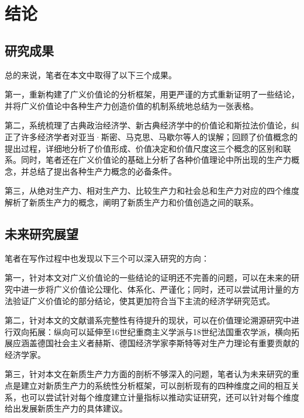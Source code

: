 
\chapter{结论}

\section{研究成果}

总的来说，笔者在本文中取得了以下三个成果。

第一，重新构建了广义价值论的分析框架，用更严谨的方式重新证明了一些结论，并将广义价值论中各种生产力创造价值的机制系统地总结为一张表格。

第二，系统梳理了古典政治经济学、新古典经济学中的价值论和斯拉法价值论，纠正了许多经济学者对亚当·斯密、马克思、马歇尔等人的误解；回顾了价值概念的提出过程，详细地分析了价值形成、价值决定和价值尺度这三个概念的区别和联系。同时，笔者还在广义价值论的基础上分析了各种价值理论中所出现的生产力概念，并总结了提出各种生产力概念的必备条件。

第三，从绝对生产力、相对生产力、比较生产力和社会总和生产力对应的四个维度解析了新质生产力的概念，阐明了新质生产力和价值创造之间的联系。

\section{未来研究展望}

笔者在写作过程中也发现以下三个可以深入研究的方向：

第一，针对本文对广义价值论的一些结论的证明还不完善的问题，可以在未来的研究中进一步将广义价值论公理化、体系化、严谨化；同时，还可以尝试用计量的方法验证广义价值论的部分结论，使其更加符合当下主流的经济学研究范式。

第二，针对本文的文献谱系完整性有待提升的现状，可以在价值理论溯源研究中进行双向拓展：纵向可以延伸至16世纪重商主义学派与18世纪法国重农学派，横向拓展应涵盖德国社会主义者赫斯、德国经济学家李斯特\cite[33]{YangQiaoYuShengChanLiGaiNianCongSiMiDaoMaKeSiDeSiXiangPuXi2013}等对生产力理论有重要贡献的经济学家。

第三，针对本文在新质生产力方面的剖析不够深入的问题，笔者认为未来研究的重点是建立对新质生产力的系统性分析框架，可以剖析现有的四种维度之间的相互关系，也可以尝试针对每个维度建立计量指标以推动实证研究，还可以针对每个维度给出发展新质生产力的具体建议。
